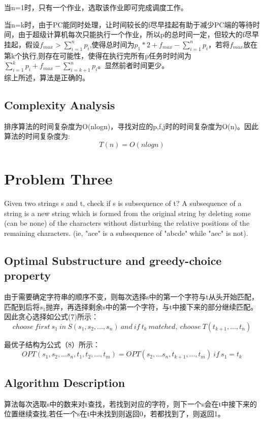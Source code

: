 \documentclass{article}
\begin{document}
当n=1时，只有一个作业，选取该作业即可完成调度工作。

当n=k时，由于PC能同时处理，让时间较长的f尽早挂起有助于减少PC端的等待时间，由于超级计算机每次只能执行一个作业，所以p的总时间一定，但较大的f尽早挂起，假设$f_{max}> \sum_{i=1}^np_i$,使得总时间为$p_1\ast2 + f_{max} - \sum_{i=1}^np_i$，若将$f_{max}$放在第k个执行,则存在可能性，使得在执行完所有p任务时时间为$\sum_{i=1}^kp_i + f_{max} - \sum_{i=k+1}^np_i$。显然前者时间更少。\\

综上所述，算法是正确的。

\subsection{Complexity Analysis}
排序算法的时间复杂度为O(nlogn)，寻找对应的p,f,j时的时间复杂度为O(n)。因此算法的时间复杂度为:
\begin{equation}
T(n) = O(nlogn)
\end{equation}


\newpage
\section{Problem Three}
Given two strings s and t, check if s is subsequence of t? A subsequence of a string is a new string which is formed from the original string by deleting some (can be none) of the characters without disturbing the relative positions of the remaining characters. (ie, "ace" is a subsequence of "abcde" while "aec" is not).


\subsection{Optimal Substructure and greedy-choice property}
由于需要确定字符串的顺序不变，则每次选择s中的第一个字符与t从头开始匹配，匹配到后将$s_1$抛弃，再选择剩余s中的第一个字符，与t中接下来的部分继续匹配。因此贪心选择如公式(7)所示：
\begin{equation}
choose\ first\ s_1\ in\ S(s_1,s_2,...,s_n)\ and\ if\ t_k\ matched,\ choose\ T(t_{k+1},...,t_n)
\end{equation}

最优子结构为公式（8）所示：
\begin{equation}
OPT(s_1,s_2,...s_n,t_1,t_2,...,t_m) = OPT(s_2,...s_n,t_{k+1},...,t_m)\ if\ s_1 = t_k
\end{equation} 
 

\subsection{Algorithm Description}
算法每次选取s中的数来对t查找，若找到对应的字符，则下一个s会在t中接下来的位置继续查找,若任一个s在t中未找到则返回0，若都找到了，则返回1。
\end{document}
